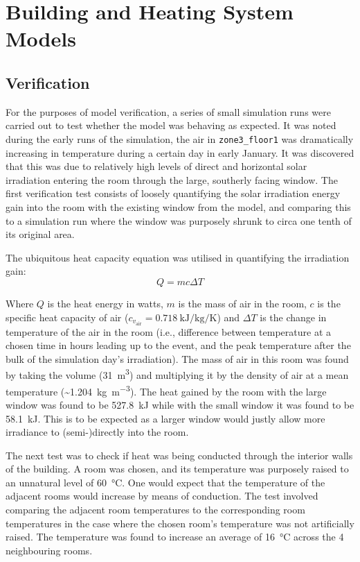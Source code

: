 \section{Building and Heating System Models}\label{sec:methodheatingsys}



\subsection{Verification} \label{subsubsec:verification}
For the purposes of model verification, a series of small simulation runs were carried out to test whether the model was behaving as expected. It was noted during the early runs of the simulation, the air in \texttt{zone3\_floor1} was dramatically increasing in temperature during a certain day in early January. It was discovered that this was due to relatively high levels of direct and horizontal solar irradiation entering the room through the large, southerly facing window. The first verification test consists of loosely quantifying the solar irradiation energy gain into the room with the existing window from the model, and comparing this to a simulation run where the window was purposely shrunk to circa one tenth of its original area. 

The ubiquitous heat capacity equation was utilised in quantifying the irradiation gain: 
\begin{equation}
    Q = mc\Delta T 
\end{equation} 

Where $Q$ is the heat energy in watts, $m$ is the mass of air in the room, $c$ is the specific heat capacity of air ($c_{v_\text{air}} = \qty{0.718}{\kilo\joule\per\kilo\gram\per\kelvin}$) and $\Delta T$ is the change in temperature of the air in the room (i.e., difference between temperature at a chosen time in hours leading up to the event, and the peak temperature after the bulk of the simulation day's irradiation). The mass of air in this room was found by taking the volume (\qty{31}{\meter\cubed}) and multiplying it by the density of air at a mean temperature (\sim \qty{1.204}{\kilo\gram\per\cubic\meter}). 
The heat gained by the room with the large window was found to be \qty{527.8}{\kilo\joule} while with the small window it was found to be \qty{58.1}{\kilo\joule}. This is to be expected as a larger window would justly allow more irradiance to (semi-)directly into the room. 

The next test was to check if heat was being conducted through the interior walls of the building. A room was chosen, and its temperature was purposely raised to an unnatural level of \qty{60}{\celsius}. One would expect that the temperature of the adjacent rooms would increase by means of conduction. The test involved comparing the adjacent room temperatures to the corresponding room temperatures in the case where the chosen room's temperature was not artificially raised. The temperature was found to increase an average of \qty{16}{\celsius} across the 4 neighbouring rooms. 


